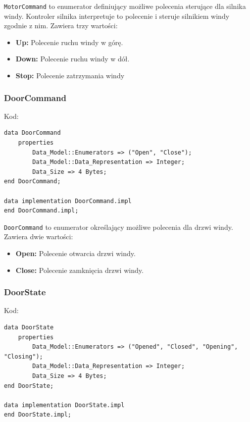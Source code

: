 \documentclass{article}
\begin{document}
    \texttt{MotorCommand} to enumerator definiujący możliwe polecenia sterujące dla silnika windy. Kontroler silnika interpretuje to polecenie i steruje silnikiem windy zgodnie z nim. Zawiera trzy wartości:

    \begin{itemize}
        \item \textbf{Up:} Polecenie ruchu windy w górę.
        \item \textbf{Down:} Polecenie ruchu windy w dół.
        \item \textbf{Stop:} Polecenie zatrzymania windy
    \end{itemize}


    \subsubsection{DoorCommand}

    Kod:
    
    \begin{lstlisting}[basicstyle=\ttfamily, keywordstyle=\bfseries]
data DoorCommand
    properties
        Data_Model::Enumerators => ("Open", "Close");
        Data_Model::Data_Representation => Integer;
        Data_Size => 4 Bytes;
end DoorCommand;

data implementation DoorCommand.impl
end DoorCommand.impl;
    \end{lstlisting}

    \texttt{DoorCommand} to enumerator określający możliwe polecenia dla drzwi windy. Zawiera dwie wartości:

    \begin{itemize}
        \item \textbf{Open:} Polecenie otwarcia drzwi windy.
        \item \textbf{Close:} Polecenie zamknięcia drzwi windy.
    \end{itemize}



    \subsubsection{DoorState}

    Kod:
    
    \begin{lstlisting}[basicstyle=\ttfamily, keywordstyle=\bfseries]
data DoorState
    properties
        Data_Model::Enumerators => ("Opened", "Closed", "Opening", "Closing");
        Data_Model::Data_Representation => Integer;
        Data_Size => 4 Bytes;
end DoorState;

data implementation DoorState.impl
end DoorState.impl;
    \end{lstlisting}
\end{document}
